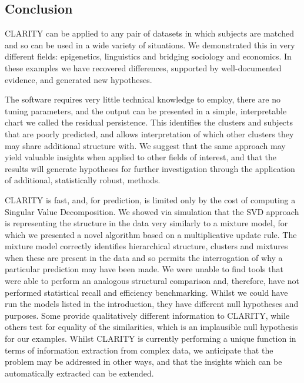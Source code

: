 \documentclass[a4]{article}
\newcommand{\+}[1]{\mathbf{#1}}
\begin{document}
\subsection{Conclusion}
\label{sec:discussion}

CLARITY can be applied to any pair of datasets in which subjects are matched and so can be used in a wide variety of situations. We demonstrated this in very different fields: epigenetics, linguistics and bridging sociology and economics. In these examples we have recovered differences, supported by well-documented evidence, and generated new hypotheses.

The software requires very little technical knowledge to employ, there are no tuning parameters, and the output can be presented in a simple, interpretable chart we called the residual persistence. This identifies the clusters and subjects that are poorly predicted, and allows interpretation of which other clusters they may share additional structure with. We suggest that the same approach may yield valuable insights when applied to other fields of interest, and that the results will generate hypotheses for further investigation through the application of additional, statistically robust, methods.

CLARITY is fast, and, for prediction, is limited only by the cost of computing a Singular Value Decomposition. We showed via simulation that the SVD approach is representing the structure in the data very similarly to a mixture model, for which we presented a novel algorithm based on a multiplicative update rule. The mixture model correctly identifies hierarchical structure, clusters and mixtures when these are present in the data and so permits the interrogation of why a particular prediction may have been made. 
We were unable to find tools that were able to perform an analogous structural comparison and, therefore, have not performed statistical recall and efficiency benchmarking. Whilst we could have run the models listed in the introduction, they have different null hypotheses and purposes. Some provide qualitatively different information to CLARITY, while others test for equality of the similarities, which is an implausible null hypothesis for our examples. Whilst CLARITY is currently performing a unique function in terms of information extraction from complex data, we anticipate that the problem may be addressed in other ways, and that the insights which can be automatically extracted can be extended.
\end{document}
